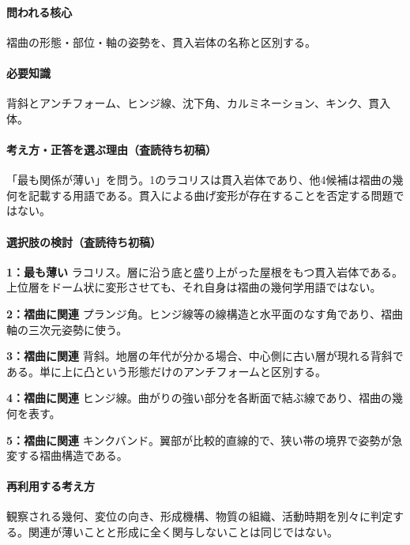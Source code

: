 \paragraph{問われる核心} 褶曲の形態・部位・軸の姿勢を、貫入岩体の名称と区別する。

\paragraph{必要知識} 背斜とアンチフォーム、ヒンジ線、沈下角、カルミネーション、キンク、貫入体。

\paragraph{考え方・正答を選ぶ理由（査読待ち初稿）} 「最も関係が薄い」を問う。1のラコリスは貫入岩体であり、他4候補は褶曲の幾何を記載する用語である。貫入による曲げ変形が存在することを否定する問題ではない。

\paragraph{選択肢の検討（査読待ち初稿）}\mbox{}\par

\noindent\textbf{1：最も薄い} ラコリス。層に沿う底と盛り上がった屋根をもつ貫入岩体である。上位層をドーム状に変形させても、それ自身は褶曲の幾何学用語ではない。\par

\noindent\textbf{2：褶曲に関連} プランジ角。ヒンジ線等の線構造と水平面のなす角であり、褶曲軸の三次元姿勢に使う。\par

\noindent\textbf{3：褶曲に関連} 背斜。地層の年代が分かる場合、中心側に古い層が現れる背斜である。単に上に凸という形態だけのアンチフォームと区別する。\par

\noindent\textbf{4：褶曲に関連} ヒンジ線。曲がりの強い部分を各断面で結ぶ線であり、褶曲の幾何を表す。\par

\noindent\textbf{5：褶曲に関連} キンクバンド。翼部が比較的直線的で、狭い帯の境界で姿勢が急変する褶曲構造である。\par

\paragraph{再利用する考え方} 観察される幾何、変位の向き、形成機構、物質の組織、活動時期を別々に判定する。関連が薄いことと形成に全く関与しないことは同じではない。

